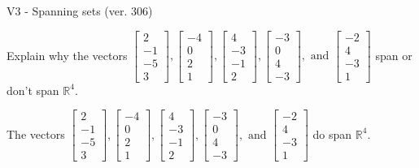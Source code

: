 \begin{exercise}
  \begin{exerciseTitle}V3 - Spanning sets (ver. 306)\end{exerciseTitle}
  \begin{exerciseStatement}
    Explain why the vectors \(\left[\begin{array}{r}
2 \\
-1 \\
-5 \\
3
\end{array}\right] , \left[\begin{array}{r}
-4 \\
0 \\
2 \\
1
\end{array}\right] , \left[\begin{array}{r}
4 \\
-3 \\
-1 \\
2
\end{array}\right] , \left[\begin{array}{r}
-3 \\
0 \\
4 \\
-3
\end{array}\right] , \text{ and } \left[\begin{array}{r}
-2 \\
4 \\
-3 \\
1
\end{array}\right]\) span or don't span \(\mathbb{R}^4\). 
	


  \end{exerciseStatement}
  \begin{exerciseAnswer}
   The vectors \(\left[\begin{array}{r}
2 \\
-1 \\
-5 \\
3
\end{array}\right] , \left[\begin{array}{r}
-4 \\
0 \\
2 \\
1
\end{array}\right] , \left[\begin{array}{r}
4 \\
-3 \\
-1 \\
2
\end{array}\right] , \left[\begin{array}{r}
-3 \\
0 \\
4 \\
-3
\end{array}\right] , \text{ and } \left[\begin{array}{r}
-2 \\
4 \\
-3 \\
1
\end{array}\right]\) 
  	 do  
	span \(\mathbb{R}^4\).
  



\end{exerciseAnswer}
\end{exercise}
